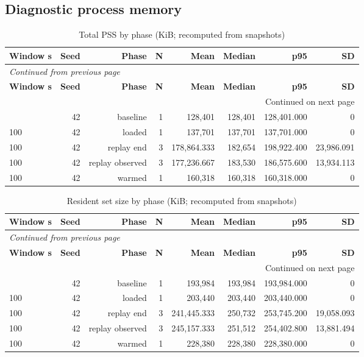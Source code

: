 \documentclass[10pt,a4paper]{article}
\begin{document}
\subsection{Diagnostic process memory}
\begingroup\small\setlength{\tabcolsep}{4pt}\renewcommand{\arraystretch}{1.12}
\begin{longtable}{@{}lrrrrrrr@{}}
\caption{Total PSS by phase (KiB; recomputed from snapshots)}\\
\toprule
\textbf{Window s} & \textbf{Seed} & \textbf{Phase} & \textbf{N} & \textbf{Mean} & \textbf{Median} & \textbf{p95} & \textbf{SD} \\
\midrule\endfirsthead
\multicolumn{8}{l}{\small\itshape Continued from previous page}\\
\toprule
\textbf{Window s} & \textbf{Seed} & \textbf{Phase} & \textbf{N} & \textbf{Mean} & \textbf{Median} & \textbf{p95} & \textbf{SD} \\
\midrule\endhead
\midrule\multicolumn{8}{r}{\small Continued on next page}\\\endfoot
\bottomrule\endlastfoot
100 & 42 & baseline & 1 & 128,401 & 128,401 & 128,401.000 & 0 \\
100 & 42 & loaded & 1 & 137,701 & 137,701 & 137,701.000 & 0 \\
100 & 42 & replay end & 3 & 178,864.333 & 182,654 & 198,922.400 & 23,986.091 \\
100 & 42 & replay observed & 3 & 177,236.667 & 183,530 & 186,575.600 & 13,934.113 \\
100 & 42 & warmed & 1 & 160,318 & 160,318 & 160,318.000 & 0 \\
\end{longtable}\endgroup
\begingroup\small\setlength{\tabcolsep}{4pt}\renewcommand{\arraystretch}{1.12}
\begin{longtable}{@{}lrrrrrrr@{}}
\caption{Resident set size by phase (KiB; recomputed from snapshots)}\\
\toprule
\textbf{Window s} & \textbf{Seed} & \textbf{Phase} & \textbf{N} & \textbf{Mean} & \textbf{Median} & \textbf{p95} & \textbf{SD} \\
\midrule\endfirsthead
\multicolumn{8}{l}{\small\itshape Continued from previous page}\\
\toprule
\textbf{Window s} & \textbf{Seed} & \textbf{Phase} & \textbf{N} & \textbf{Mean} & \textbf{Median} & \textbf{p95} & \textbf{SD} \\
\midrule\endhead
\midrule\multicolumn{8}{r}{\small Continued on next page}\\\endfoot
\bottomrule\endlastfoot
100 & 42 & baseline & 1 & 193,984 & 193,984 & 193,984.000 & 0 \\
100 & 42 & loaded & 1 & 203,440 & 203,440 & 203,440.000 & 0 \\
100 & 42 & replay end & 3 & 241,445.333 & 250,732 & 253,745.200 & 19,058.093 \\
100 & 42 & replay observed & 3 & 245,157.333 & 251,512 & 254,402.800 & 13,881.494 \\
100 & 42 & warmed & 1 & 228,380 & 228,380 & 228,380.000 & 0 \\
\end{longtable}\endgroup
\end{document}
